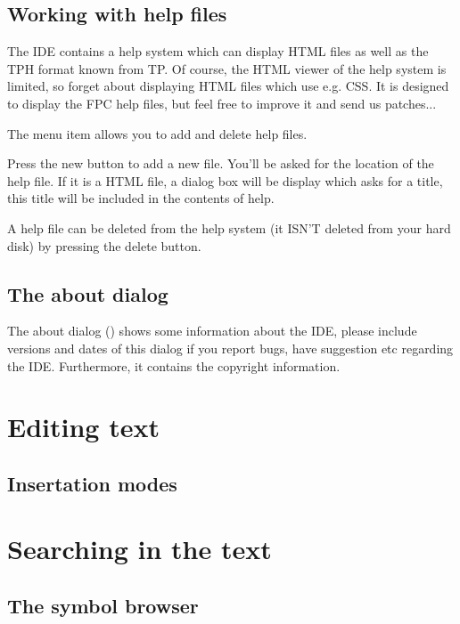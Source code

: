 \subsection{Working with help files}
The IDE contains a help system which can display HTML files
as well as the TPH format known from TP. Of course, the HTML
viewer of the help system is limited, so forget about displaying
HTML files which use e.g. CSS. It is designed to display the FPC
help files, but feel free to improve it and send us patches...

The menu item  allows you to add and delete
help files.

Press the new button to add a new file. You'll be asked for the location
of the help file. If it is a HTML file, a dialog box will be display
which asks for a title, this title will be included in the
contents of help.

A help file can be deleted from the help system (it ISN'T deleted from
your hard disk) by pressing the delete button.

\subsection{The about dialog}
The about dialog () shows some information
about the IDE, please include versions and dates of this
dialog if you report bugs, have suggestion etc regarding the IDE.
Furthermore, it contains the copyright information.

\section{Editing text}
\label{ide:editingtext}

\subsection{Insertation modes}

\section{Searching in the text}
\label{ide:searching}

\subsection{The symbol browser}

